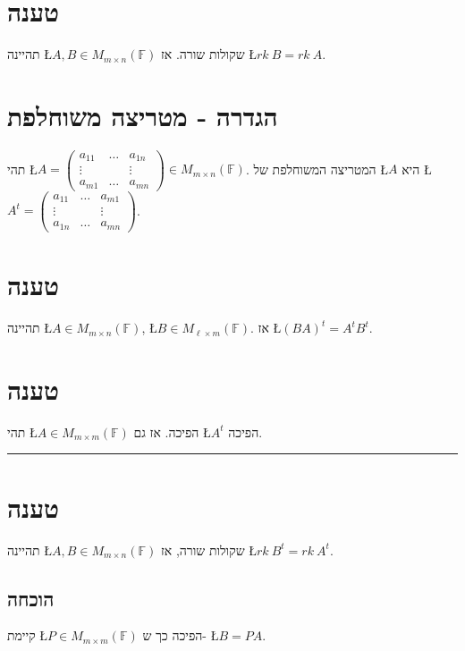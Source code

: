 \documentclass[english,hebrew]{article}
\newcommand{\sqrm}{M_{m\times m}(\mathbb{F})}
\newcommand{\matrmn}{M_{m\times n}(\mathbb{F})}
\begin{document}
\section{טענה}

תהיינה \L{$A,B\in M_{m\times n}(\mathbb{F})$} שקולות שורה. אז \L{$rk\:B=rk\:A$}.

\section{הגדרה - מטריצה משוחלפת}

תהי \L{$A=\begin{pmatrix}a_{11} & \dots & a_{1n}\\
\vdots &  & \vdots\\
a_{m1} & \dots & a_{mn}
\end{pmatrix}\in\matrmn$}. המטריצה המשוחלפת של \L{$A$} היא \L{$A^{t}=\begin{pmatrix}a_{11} & \dots & a_{m1}\\
\vdots &  & \vdots\\
a_{1n} & \dots & a_{mn}
\end{pmatrix}$}.

\section{טענה}

תהיינה \L{$A\in\matrmn$}, \L{$B\in M_{\ell\times m}(\mathbb{F})$}.
אז \L{$(BA)^{t}=A^{t}B^{t}$}.

\section{טענה}

תהי \L{$A\in\sqrm$} הפיכה. אז גם \L{$A^{t}$} הפיכה.\\

\rule[0.5ex]{1\columnwidth}{1pt}

\section{טענה}

תהיינה \L{$A,B\in\matrmn$} שקולות שורה, אז \L{$rk\:B^{t}=rk\:A^{t}$}. 

\subsection{הוכחה}

קיימת \L{$P\in\sqrm$} הפיכה כך ש- \L{$B=PA$}.
\end{document}
